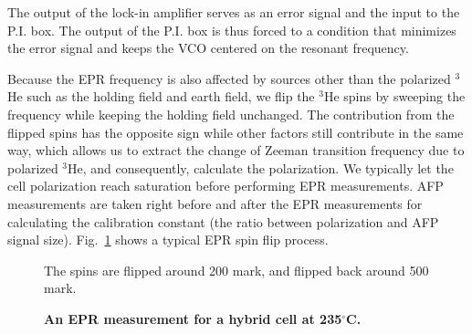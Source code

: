 The output of the lock-in amplifier serves as an error signal and the input to the P.I. box. The output of the P.I. box is thus forced to a condition that minimizes the error signal and keeps the VCO centered on the resonant frequency.

Because the EPR frequency is also affected by sources other than the polarized $^{3}$He such as the holding field and earth field, we flip the $^{3}$He spins by sweeping the frequency while keeping the holding field unchanged. The contribution from the flipped spins has the opposite sign while other factors still contribute in the same way, which allows us to extract the change of Zeeman transition frequency due to polarized $^{3}$He, and consequently, calculate the polarization. We typically let the cell polarization reach saturation before performing EPR measurements. AFP measurements are taken right before and after the EPR measurements for calculating the calibration constant (the ratio between polarization and AFP signal size). Fig.~\ref{epr} shows a typical EPR spin flip process.

\begin{figure}[t!]
	\centering
	\caption{{\bf An EPR measurement for a hybrid cell at 235$^{\circ}$C.}} The spins are flipped around 200 mark, and flipped back around 500 mark.
	\label{epr}
\end{figure}

